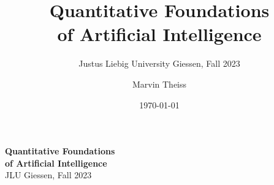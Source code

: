 
\subject{Lecture Notes}
\title{Quantitative Foundations\\ of Artificial Intelligence}
\subtitle{Justus Liebig University Giessen, Fall 2023}
\author{Marvin Theiss}
\date{\today}



\begin{titlepage}
    \begin{flushright}
        {
            \bfseries\fontsize{40}{40}\selectfont
            Quantitative Foundations \\
            of Artificial Intelligence \\[24pt]
        }
        {
            \fontsize{32}{36}\selectfont
            JLU Giessen, Fall 2023
        }
    \end{flushright}

\end{titlepage}

\cleardoublepage
\restoregeometry
{}

\uppertitleback{
    This work \copyright{} 2024 by \href{https://github.com/mrvnthss}{Marvin Theiss} is licensed under \href{http://creativecommons.org/licenses/by-nc-sa/4.0/?ref=chooser-v1}{CC BY-NC-SA 4.0} \ccbyncsa \\

    You are free to distribute, remix, adapt, and build upon the material in any medium or format. You must give \href{https://creativecommons.org/licenses/by-nc-sa/4.0/?ref=chooser-v1\#ref-appropriate-credit}{appropriate credit}, provide a link to the license, and \href{https://creativecommons.org/licenses/by-nc-sa/4.0/?ref=chooser-v1\#ref-indicate-changes}{indicate if changes were made}. You may do so in any reasonable manner, but not in any way that suggests the licensor endorses you or your use. You may not use the material for \href{https://creativecommons.org/licenses/by-nc-sa/4.0/?ref=chooser-v1\#ref-commercial-purposes}{commercial purposes}. If you remix, transform, or build upon the material, you must distribute your contributions under the \href{https://creativecommons.org/licenses/by-nc-sa/4.0/?ref=chooser-v1\#ref-same-license}{same license} as the original.
}

